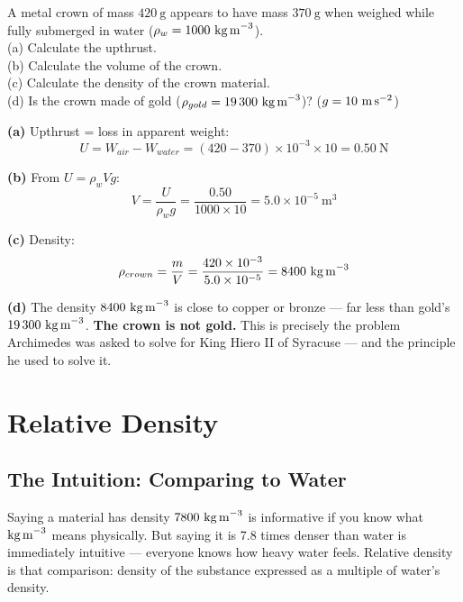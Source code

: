 \begin{examplebox}[11.5]
A metal crown of mass $420\ \text{g}$ appears to have
mass $370\ \text{g}$ when weighed while fully submerged
in water ($\rho_w = 1000\ \text{kg\,m}^{-3}$).\\
(a) Calculate the upthrust.\\
(b) Calculate the volume of the crown.\\
(c) Calculate the density of the crown material.\\
(d) Is the crown made of gold ($\rho_{gold}
= 19\,300\ \text{kg\,m}^{-3}$)?
($g = 10\ \text{m\,s}^{-2}$)
\end{examplebox}

\begin{solutionbox}
\textbf{(a)} Upthrust = loss in apparent weight:
\[
  U = W_{air} - W_{water}
  = (420 - 370) \times 10^{-3} \times 10
  = 0.50\ \text{N}
\]

\textbf{(b)} From $U = \rho_w V g$:
\[
  V = \frac{U}{\rho_w g}
  = \frac{0.50}{1000 \times 10}
  = 5.0\times10^{-5}\ \text{m}^3
\]

\textbf{(c)} Density:
\[
  \rho_{crown} = \frac{m}{V}
  = \frac{420\times10^{-3}}{5.0\times10^{-5}}
  = 8400\ \text{kg\,m}^{-3}
\]

\textbf{(d)} The density $8400\ \text{kg\,m}^{-3}$
is close to copper or bronze --- far less than gold's
$19\,300\ \text{kg\,m}^{-3}$. \textbf{The crown is
not gold.} This is precisely the problem Archimedes
was asked to solve for King Hiero II of Syracuse ---
and the principle he used to solve it.
\end{solutionbox}

\section{Relative Density}

\subsection{The Intuition: Comparing to Water}

Saying a material has density $7800\ \text{kg\,m}^{-3}$
is informative if you know what $\text{kg\,m}^{-3}$
means physically. But saying it is 7.8 times denser
than water is immediately intuitive --- everyone knows
how heavy water feels. Relative density is that
comparison: density of the substance expressed as a
multiple of water's density.

